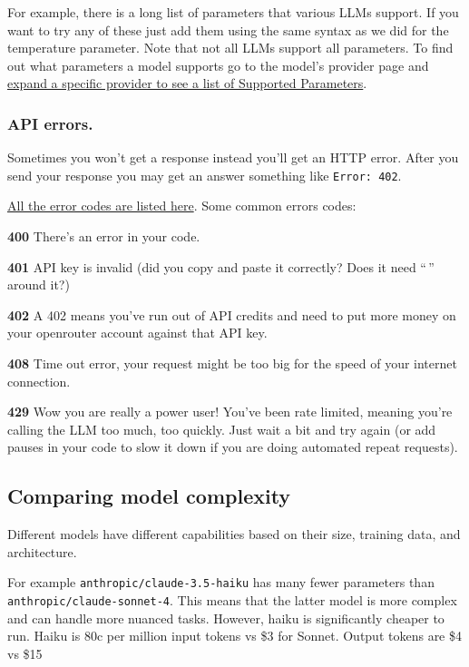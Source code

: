 \documentclass[
  letterpaper,
  DIV=11,
  numbers=noendperiod]{scrreprt}
\begin{document}
For example, there is a long list of parameters that various LLMs
support. If you want to try any of these just add them using the same
syntax as we did for the temperature parameter. Note that not all LLMs
support all parameters. To find out what parameters a model supports go
to the model's provider page and
\href{https://openrouter.ai/docs/api-reference/parameters}{expand a
specific provider to see a list of Supported Parameters}.

\subsubsection{API errors.}\label{api-errors.}

Sometimes you won't get a response instead you'll get an HTTP error.
After you send your response you may get an answer something like
\texttt{Error:\ 402}.

\href{https://openrouter.ai/docs/api-reference/errors}{All the error
codes are listed here}. Some common errors codes:

\textbf{400} There's an error in your code.

\textbf{401} API key is invalid (did you copy and paste it correctly?
Does it need ``\,'' around it?)

\textbf{402} A 402 means you've run out of API credits and need to put
more money on your openrouter account against that API key.

\textbf{408} Time out error, your request might be too big for the speed
of your internet connection.

\textbf{429} Wow you are really a power user! You've been rate limited,
meaning you're calling the LLM too much, too quickly. Just wait a bit
and try again (or add pauses in your code to slow it down if you are
doing automated repeat requests).

\subsection{Comparing model
complexity}\label{comparing-model-complexity}

Different models have different capabilities based on their size,
training data, and architecture.

For example \texttt{anthropic/claude-3.5-haiku} has many fewer
parameters than \texttt{anthropic/claude-sonnet-4}. This means that the
latter model is more complex and can handle more nuanced tasks. However,
haiku is significantly cheaper to run. Haiku is 80c per million input
tokens vs \$3 for Sonnet. Output tokens are \$4 vs \$15
\end{document}

